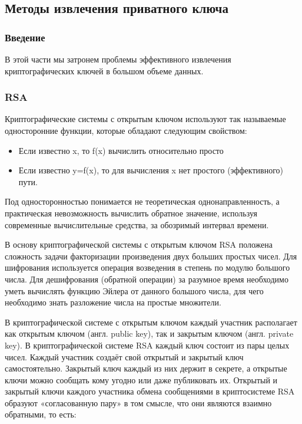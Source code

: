 \documentclass[20pt]{article}
\begin{document}
\subsection{Методы извлечения приватного ключа \cite{playing-hide-and-seek-with-stored-keys} }
\subsubsection{Введение}
В этой части мы затронем проблемы эффективного извлечения криптографических
ключей в большом объеме данных.

\subsubsection{RSA}
Криптографические системы с открытым ключом используют так называемые односторонние функции, которые обладают следующим свойством:

\begin{itemize}
  \item Если известно x, то f(x) вычислить относительно просто
  \item Если известно y=f(x), то для вычисления x нет простого (эффективного) пути.
\end{itemize}

Под односторонностью понимается не теоретическая однонаправленность, а практическая невозможность вычислить обратное значение, используя современные вычислительные средства, за обозримый интервал времени.

В основу криптографической системы с открытым ключом RSA положена сложность задачи факторизации произведения двух больших простых чисел. Для шифрования используется операция возведения в степень по модулю большого числа. Для дешифрования (обратной операции) за разумное время необходимо уметь вычислять функцию Эйлера от данного большого числа, для чего необходимо знать разложение числа на простые множители.

В криптографической системе с открытым ключом каждый участник располагает как открытым ключом (англ. public key), так и закрытым ключом (англ. private key). В криптографической системе RSA каждый ключ состоит из пары целых чисел. Каждый участник создаёт свой открытый и закрытый ключ самостоятельно. Закрытый ключ каждый из них держит в секрете, а открытые ключи можно сообщать кому угодно или даже публиковать их. Открытый и закрытый ключи каждого участника обмена сообщениями в криптосистеме RSA образуют «согласованную пару» в том смысле, что они являются взаимно обратными, то есть:
\end{document}
